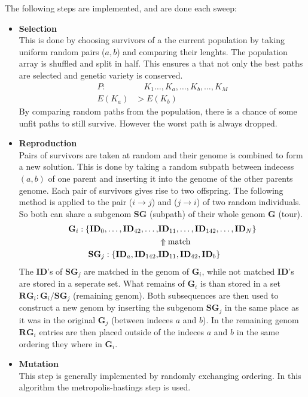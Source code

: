The following steps are implemented, and are done each sweep: \\
\begin{itemize}
    \item \textbf{Selection} \\ This is done by choosing survivors of a the current population by taking uniform random pairs ($a,b$) and comparing their lenghts. The population array is shuffled and split in half. This ensures a that not only the best paths are selected and genetic variety is conserved.
        \begin{align}
            P: &\quad K_1 \dots, K_a , \dots , K_b , \dots , K_M \\
            E(K_a) &> E(K_b) 
        \end{align}
        By comparing random paths from the population, there is a chance of some unfit paths to still survive. However the worst path is always dropped.
    \item \textbf{Reproduction} \\ Pairs of survivors are taken at random and their genome is combined to form a new solution. This is done by taking a random subpath between indecess $(a,b)$ of one parent and inserting it into the genome of the other parents genome. 
            Each pair of survivors gives rise to two offspring. The following method is applied to the pair ($i \rightarrow  j$) and ($j \rightarrow i$) of two random individuals.  
            So both can share a subgenom $\mathbf{SG}$   (subpath) of their whole genom $\mathbf{G}$ (tour). 
            \begin{align}
                \mathbf{G}_i: \{\mathbf{ID}_0, \dots , \mathbf{ID}_{42},\dots, &\mathbf{ID}_{11}, \dots, \mathbf{ID}_{142}, \dots, \mathbf{ID}_N \} \notag \\
                &\Uparrow \text{match}  \notag \\
                \mathbf{SG}_j: \{\mathbf{ID}_a,\mathbf{ID}_{142}, &\mathbf{ID}_{11}, \mathbf{ID}_{42},\mathbf{ID}_{b} \notag  \}
            \end{align} 
            The $\mathbf{ID}$'s of $\mathbf{SG}_j$ are matched in the genom of $\mathbf{G}_i$, while not matched $\mathbf{ID}$'s are stored in a seperate set.
            What remains of $\mathbf{G}_i$ is than stored in a set $\mathbf{RG}_i : \mathbf{G}_i / \mathbf{SG}_j$ (remaining genom). 
            Both subsequences are then used to construct a new genom by inserting the subgenom $\mathbf{SG}_j$  in the same place as it was in the original $\mathbf{G}_j$ (between indeces $a$ and $b$).
            In the remaining genom $\mathbf{RG}_i$ entries are then placed outside of the indeces $a$ and $b$ in the same ordering they where in $\mathbf{G}_i$. 
    \item \textbf{Mutation} \\ This step is generally implemented by randomly exchanging ordering. In this algorithm the metropolis-hastings step is used.
\end{itemize}

